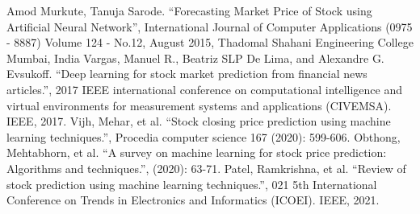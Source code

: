 \documentclass[conference]{IEEEtran}
\begin{document}
\begin{thebibliography}{00}
 Amod Murkute, Tanuja Sarode. ``Forecasting Market Price of Stock using Artificial Neural Network'', International Journal of Computer Applications (0975 - 8887) Volume 124 - No.12, August 2015, Thadomal Shahani Engineering College Mumbai, India
 Vargas, Manuel R., Beatriz SLP De Lima, and Alexandre G. Evsukoff.  ``Deep learning for stock market prediction from financial news articles.'', 2017 IEEE international conference on computational intelligence and virtual environments for measurement systems and applications (CIVEMSA). IEEE, 2017.
 Vijh, Mehar, et al. ``Stock closing price prediction using machine learning techniques.'', Procedia computer science 167 (2020): 599-606.
 Obthong, Mehtabhorn, et al.  ``A survey on machine learning for stock price prediction: Algorithms and techniques.'', (2020): 63-71.
 Patel, Ramkrishna, et al. ``Review of stock prediction using machine learning techniques.'', 021 5th International Conference on Trends in Electronics and Informatics (ICOEI). IEEE, 2021.
\end{thebibliography}
\vspace{12pt}
\end{document}
